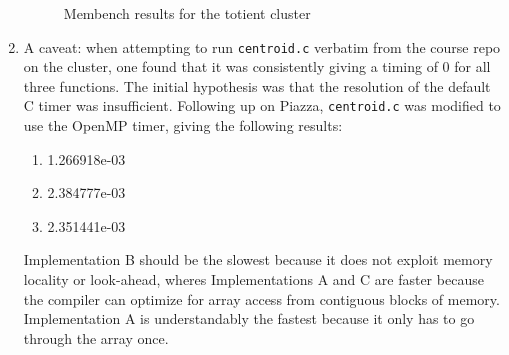 \documentclass{scrartcl}
\begin{document}
\begin{enumerate}
\begin{figure}[ht!]
\begin{subfigure}[c]{.5\textwidth}
        \end{subfigure}
        \caption{Membench results for the totient cluster\label{fig:cluster}}
      \end{figure}
    \item A caveat: when attempting to run \verb|centroid.c| verbatim from the course repo on the cluster, one found that it was consistently giving a timing of 0 for all three functions. The initial hypothesis was that the resolution of the default C timer was insufficient. Following up on Piazza, \verb|centroid.c| was modified to use the OpenMP timer, giving the following results:
    \begin{enumerate}[label=(\alph*)]
      \item 1.266918e-03
      \item 2.384777e-03
      \item 2.351441e-03
    \end{enumerate}
    Implementation B should be the slowest because it does not exploit memory locality or look-ahead, wheres Implementations A and C are faster because the compiler can optimize for array access from contiguous blocks of memory. Implementation A is understandably the fastest because it only has to go through the array once.
  \end{enumerate}
\end{document}
